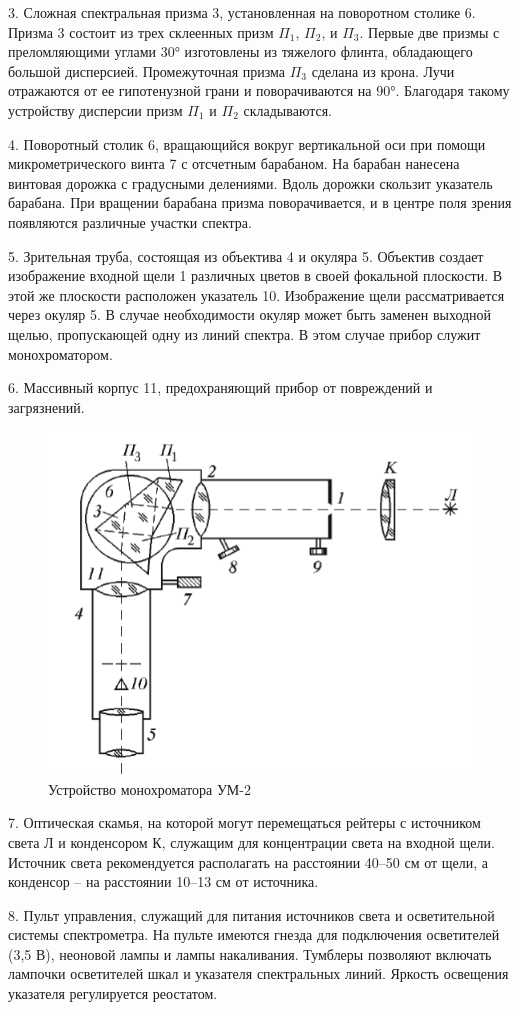 \documentclass[a4paper,12pt]{article}
\begin{document}
3. Сложная спектральная призма 3, установленная на поворотном столике 6. Призма 3 состоит из трех склеенных призм $\Pi_1$, $\Pi_2$, и $\Pi_3$. Первые две призмы с преломляющими углами 30° изготовлены из тяжелого флинта, обладающего большой дисперсией. Промежуточная призма $\Pi_3$ сделана из крона. Лучи отражаются от ее гипотенузной грани и поворачиваются на 90°. Благодаря такому устройству дисперсии призм $\Pi_1$ и $\Pi_2$ складываются.

4. Поворотный столик 6, вращающийся вокруг вертикальной оси при помощи микрометрического винта 7 с отсчетным барабаном. На барабан нанесена винтовая дорожка с градусными делениями. Вдоль дорожки скользит указатель барабана. При вращении барабана призма поворачивается, и в центре поля зрения появляются различные участки спектра.

5. Зрительная труба, состоящая из объектива 4 и окуляра 5. Объектив создает изображение входной щели 1 различных цветов в своей фокальной плоскости. В этой же плоскости расположен указатель 10. Изображение щели рассматривается через окуляр 5. В случае необходимости окуляр может быть заменен выходной щелью, пропускающей одну из линий спектра. В этом случае прибор служит монохроматором.

6. Массивный корпус 11, предохраняющий прибор от повреждений и загрязнений.

\begin{figure}[h]
\centering
\includegraphics[width=0.5\linewidth]{img2.png}
\caption{Устройство монохроматора УМ-2}
\label{img2}
\end{figure}

7. Оптическая скамья, на которой могут перемещаться рейтеры с источником света Л и конденсором К, служащим для концентрации света на входной щели. Источник света рекомендуется располагать на расстоянии 40--50 см от щели, а конденсор -- на расстоянии 10--13 см от источника.

8. Пульт управления, служащий для питания источников света и осветительной системы спектрометра. На пульте имеются гнезда для подключения осветителей (3,5 В), неоновой лампы и лампы накаливания. Тумблеры позволяют включать лампочки осветителей шкал и указателя спектральных линий. Яркость освещения указателя регулируется реостатом.
\end{document}
